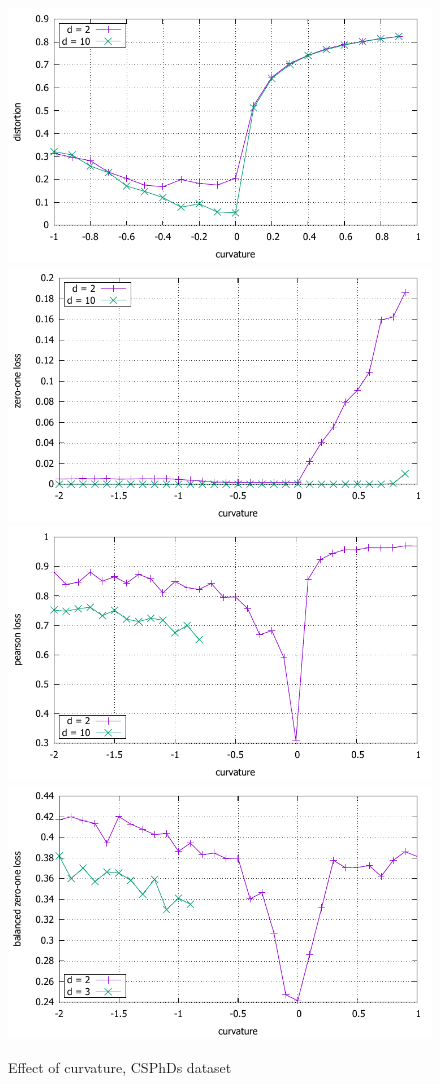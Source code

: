 \documentclass{article} %
\begin{document}
\begin{figure}
    \centering
    \includegraphics[width = 0.49 \textwidth]{CSPhDs_distortion.pdf}
    \includegraphics[width = 0.49 \textwidth]{CSPhDs_zero_one.pdf}
    \includegraphics[width = 0.49 \textwidth]{CSPhDs_pearson.pdf}
    \includegraphics[width = 0.49 \textwidth]{CSPhDs_balanced_zero_one.pdf}
    \caption{Effect of curvature, CSPhDs dataset}
    \label{fig:CSPhDs}
\end{figure}
\end{document}

